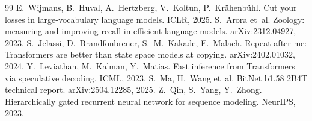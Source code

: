\documentclass[11pt]{article}
\begin{document}
\begin{thebibliography}{99}
 E.~Wijmans, B.~Huval, A.~Hertzberg, V.~Koltun, P.~Kr\"ahenb\"uhl. Cut your losses in large-vocabulary language models. ICLR, 2025.
 S.~Arora et~al. Zoology: measuring and improving recall in efficient language models. arXiv:2312.04927, 2023.
 S.~Jelassi, D.~Brandfonbrener, S.~M.~Kakade, E.~Malach. Repeat after me: Transformers are better than state space models at copying. arXiv:2402.01032, 2024.
 Y.~Leviathan, M.~Kalman, Y.~Matias. Fast inference from Transformers via speculative decoding. ICML, 2023.
 S.~Ma, H.~Wang et~al. BitNet b1.58 2B4T technical report. arXiv:2504.12285, 2025.
 Z.~Qin, S.~Yang, Y.~Zhong. Hierarchically gated recurrent neural network for sequence modeling. NeurIPS, 2023.
\end{thebibliography}
\end{document}
